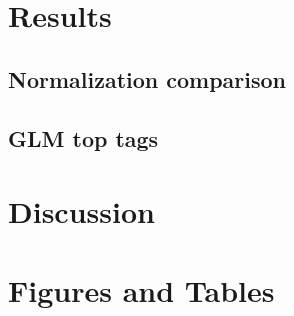 \documentclass{bioinfo}
\begin{document}
\section{Results}
\subsection{Normalization comparison}
\subsection{GLM top tags}

\section{Discussion}

\section{Figures and Tables}



%


%


\end{document}
